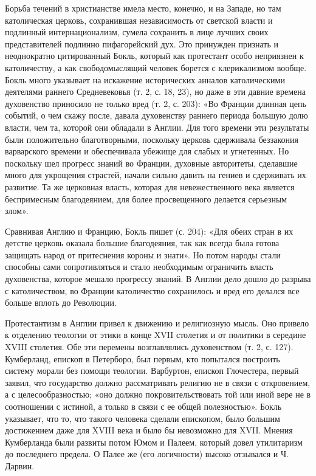 Борьба течений  в христианстве имела  место, конечно, и на  Западе, но
там католическая церковь, сохранившая независимость от светской власти
и  подлинный интернационализм,  сумела сохранить  в лице  лучших своих
представителей  подлинно  пифагорейский  дух. Это  принужден  признать
и  неоднократно  цитированный  Бокль,  который  как  протестант  особо
неприязнен  к католичеству,  а как  свободомыслящий человек  борется с
клерикализмом вообще. Бокль много  указывает на искажение исторических
анналов католическими  деятелями раннего  Средневековья (т. 2,  с. 18,
23), но даже в эти давние времена духовенство приносило не только вред
(т. 2, с.  203): «Во Франции длинная цепь событий,  о чем скажу после,
давала  духовенству  раннего  периода  большую долю  власти,  чем  та,
которой они  обладали в Англии.  Для того времени эти  результаты были
положительно  благотворными, поскольку  церковь сдерживала  беззакония
варварского времени  и обеспечивала  убежище для слабых  и угнетенных.
Но  поскольку шел  прогресс  знаний во  Франции, духовные  авторитеты,
сделавшие много для укрощения страстей, начали сильно давить на гениев
и  сдерживать  их  развитие.  Та  же  церковная  власть,  которая  для
невежественного  века является  беспримесным  благодеянием, для  более
просвещенного делается серьезным злом».

Сравнивая Англию и  Францию, Бокль пишет (с. 204): «Для  обеих стран в
их детстве  церковь оказала большие  благодеяния, так как  всегда была
готова защищать народ от притеснения  короны и знати». Но потом народы
стали  способны сами  сопротивляться  и  стало необходимым  ограничить
власть  духовенства, которое  мешало прогрессу  знаний. В  Англии дело
дошло до разрыва с  католичеством, во Франции католичество сохранилось
и вред его делался все больше вплоть до Революции.

Протестантизм  в Англии  привел к  движению и  религиозную мысль.  Оно
привело  к отделению  теологии от  этики в  конце XVII  столетия и  от
политики  в середине  XVIII столетия.  Обе эти  перемены возглавлялись
духовенством  (т. 2,  с. 127).  Кумберланд, епископ  в Петерборо,  был
первым, кто  попытался построить  систему морали без  помощи теологии.
Варбуртон, епископ  Глочестера, первый заявил, что  государство должно
рассматривать религию не в связи с откровением, а с целесообразностью;
«оно должно  покровительствовать той  или иной  вере не  в соотношении
с  истиной,  а   только  в  связи  с  ее   общей  полезностью».  Бокль
указывает, что то, что такого человека сделали епископом, было большим
достижением  даже  для XVIII  века  и  было  бы невозможно  для  XVII.
Мнения Кумберланда  были развиты  потом Юмом  и Палеем,  который довел
утилитаризм до последнего предела. О  Палее же (его логичности) высоко
отзывался и Ч. Дарвин.

